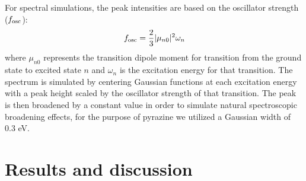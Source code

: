 \documentclass{article}
\begin{document}
For spectral simulations, the peak intensities are based on the oscillator strength ($f_{\rm osc}$):
\begin{equation}
f_{\rm osc} = \frac{2}{3}|\mu_{n0}|^2 \omega_n
\end{equation}
where $\mu_{n0}$ represents the transition dipole moment for transition from the ground state to excited state $n$ and $\omega_n$ is the excitation energy for that transition. The spectrum is simulated by centering Gaussian functions at each excitation energy with a peak height scaled by the oscillator strength of that transition. The peak is then broadened by a constant value in order to simulate natural spectroscopic broadening effects, for the purpose of pyrazine we utilized a Gaussian width of 0.3 eV. 
\section{Results and discussion}







\end{document}
